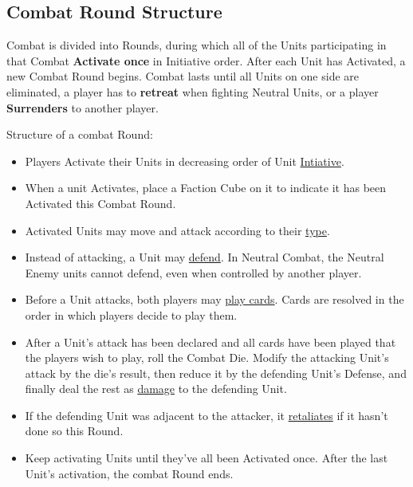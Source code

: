 \begin{multicols}{2}

\subsection*{Combat Round Structure}
Combat is divided into Rounds, during which all of the Units participating in that Combat \textbf{Activate once} in Initiative order.
After each Unit has Activated, a new Combat Round begins.
Combat lasts until all Units on one side are eliminated, a player has to \textbf{retreat} when fighting Neutral Units, or a player \textbf{Surrenders} to another player.

Structure of a combat Round:
\begin{itemize}
  \item Players Activate their Units in decreasing order of Unit \hyperlink{Initiative}{Intiative}.
  \item When a unit Activates, place a Faction Cube on it to indicate it has been Activated this Combat Round.
  \item Activated Units may move and attack according to their \hyperlink{Unittype}{type}.
  \item Instead of attacking, a Unit may \hyperlink{Defend}{defend}.
  In Neutral Combat, the Neutral Enemy units cannot defend, even when controlled by another player.
  \item Before a Unit attacks, both players may \hyperlink{CombatCards}{play cards}. Cards are resolved in the order in which players decide to play them.
  \item After a Unit's attack has been declared and all cards have been played that the players wish to play, roll the Combat Die.
    Modify the attacking Unit's attack by the die's result, then reduce it by the defending Unit's Defense, and finally deal the rest as \hyperlink{HP}{damage} to the defending Unit.
  \item If the defending Unit was adjacent to the attacker, it \hyperlink{Retaliate}{retaliates} if it hasn't done so this Round.
  \item Keep activating Units until they've all been Activated once.
After the last Unit's activation, the combat Round ends.
\end{itemize}

\end{multicols}

